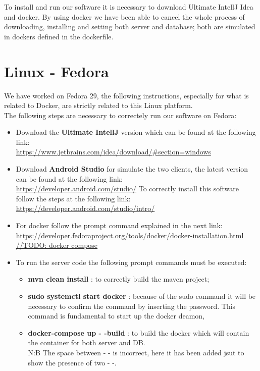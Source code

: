 To install and run our software it is necessary to download Ultimate IntellJ Idea and docker. By using docker we have been able to cancel the whole process of downloading, installing and setting both server and database; both are simulated in dockers defined in the dockerfile.

\section{Linux - Fedora}
We have worked on Fedora 29, the following instructions, especially for what is related to Docker, are strictly related to this Linux platform.\\
The following steps are necessary to correctely run our software on Fedora:
\begin{itemize}
	\item Download the \textbf{Ultimate IntellJ} version which can be found at the following link:\\
 		\url{https://www.jetbrains.com/idea/download/#section=windows}

	\item Download \textbf{Android Studio} for simulate the two clients, the latest version can be found at the following link:\\
		\url{https://developer.android.com/studio/}
		To correctly install this software follow the steps at the following link:\\
		\url{https://developer.android.com/studio/intro/}

	\item For docker follow the prompt command explained in the next link:\\
		\url{https://developer.fedoraproject.org/tools/docker/docker-installation.html}\\
		\url{//TODO: docker compose}%

	\item To run the server code the following prompt commands must be executed:\\
		\begin{itemize}
			\item \textbf{ mvn clean install} : to correctly build the maven project;
			\item \textbf{ sudo systemctl start docker} : because of the sudo command it will be necessary to confirm the 					command by inserting the password. This command is fundamental to start up the docker deamon,	
			\item \textbf{ docker-compose up - -build} : to build the docker which will contain the container for both server 					and DB.\\N:B The space between - - is incorrect, here it has been added jsut to show the presence of two - -.
		\end{itemize}


\end{itemize}
